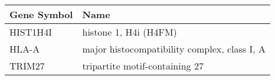 \begin{tabular}{ll}
\toprule
Gene Symbol &                                         Name \\
\midrule
   HIST1H4I &                        histone 1, H4i (H4FM) \\
      HLA-A & major histocompatibility complex, class I, A \\
     TRIM27 &               tripartite motif-containing 27 \\
\bottomrule
\end{tabular}
